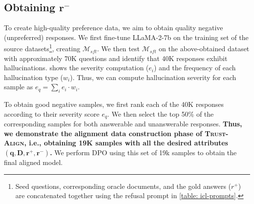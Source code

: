\documentclass{article} %
\newcommand{\method}[0]{\textsc{Trust-Align}}
\begin{document}
\subsection{Obtaining {$\mathbf{r^-}$}}
To create high-quality preference data, we aim to obtain quality negative (unpreferred) responses. We first fine-tune LLaMA-2-7b on the training set of the source datasets\footnote{Seed questions, corresponding oracle documents, and the gold answers ($r^+$) are concatenated together using the refusal prompt in \cref{table: icl-prompts}.}, creating \(\mathcal{M}_{sft}\). We then test \(\mathcal{M}_{sft}\) on the above-obtained dataset with approximately 70K questions and identify that 40K responses exhibit hallucinations.  shows the severity computation ($e_i$) and the frequency of each hallucination type ($w_i$). Thus, we can compute hallucination severity for each sample as $e_q = \sum_i e_i \cdot w_i$. 


\begin{table}[h!]
\caption{\footnotesize{Fraction of each hallucination amongst all the observed hallucinations in \(\mathcal{M}_{sft}\) (40,985), with possible overlap. $w_i$ shows the severity computation of each hallucination. $I_{\text{condition}}$ = 1 if condition is True otherwise it is 0. See \cref{fig:hallucination-errors-breakdown} for the detailed breakdown of the last three errors.}}
\label{table: error-types}

\centering
{}
\end{table}

To obtain good negative samples, we first rank each of the 40K responses according to their severity score \(e_q\). We then select the top 50\% of the corresponding samples for both answerable and unanswerable responses. \textbf{Thus, we demonstrate the alignment data construction phase of \method{}, i.e., obtaining 19K samples with all the desired attributes \((\mathbf{q,D,r^+,r^-})\).} We perform DPO using this set of 19k samples to obtain the final aligned model.
\end{document}
